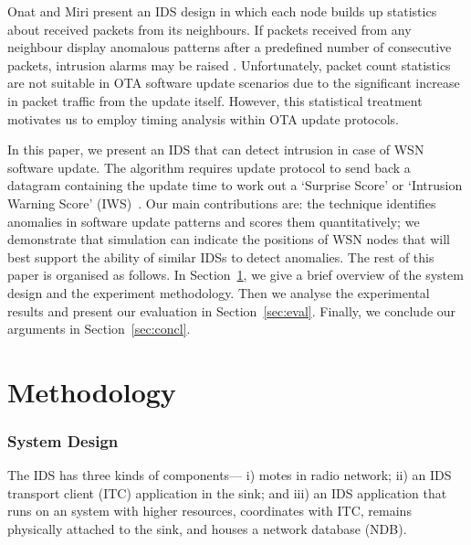 \documentclass{CRPITStyle}
\renewcommand{\cite}{\citep}
\begin{document}
Onat and Miri present an IDS design in which each node builds up statistics about received packets from its neighbours.
If packets received from any neighbour display anomalous patterns after a predefined number of consecutive packets, intrusion alarms may be raised \cite{1512911}.
Unfortunately, packet count statistics are not suitable in OTA software update scenarios due to the significant increase in packet traffic from the update itself.
However, this statistical treatment motivates us to employ timing analysis within OTA update protocols.

In this paper, we present an IDS that can detect intrusion in case of WSN software update.
The algorithm requires update protocol to send back a datagram containing the update time to work out a `Surprise Score' or `Intrusion Warning Score' (IWS)~\cite{aalam15}.
Our main contributions are: 
the technique identifies anomalies in software update patterns and scores them quantitatively;
we demonstrate that simulation can indicate the positions of WSN nodes that will best support the ability of similar IDSs to detect anomalies. 
The rest of this paper is organised as follows.
In Section~\ref{sec:meth}, we give a brief overview of the system  design and the experiment methodology. 
Then we analyse the experimental results and present our evaluation in Section~\ref{sec:eval}.  
Finally, we conclude our arguments in Section~\ref{sec:concl}.

\section{Methodology}
\label{sec:meth}

\subsubsection*{System Design}
The IDS has three kinds of components---%
i) motes in radio network; 
ii) an IDS transport client (ITC) application in the sink; and
iii) an IDS application that runs on an system with higher resources, coordinates with ITC, remains physically attached to the sink, and houses a network database (NDB).
\end{document}
